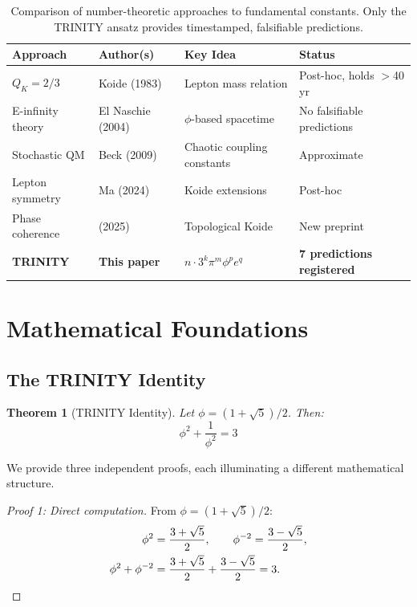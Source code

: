 \documentclass[aps,prd,preprint,superscriptaddress,showpacs,nofootinbib,longbibliography]{revtex4-2}
\newtheorem{theorem}{Theorem}
\begin{document}
\begin{table}[h]
\centering
\small
\begin{tabular}{@{}llll@{}}
\toprule
\textbf{Approach} & \textbf{Author(s)} & \textbf{Key Idea} & \textbf{Status} \\
\midrule
$Q_K = 2/3$ & Koide (1983) & Lepton mass relation & Post-hoc, holds $>$40 yr \\
E-infinity theory & El Naschie (2004) & $\phi$-based spacetime & No falsifiable predictions \\
Stochastic QM & Beck (2009) & Chaotic coupling constants & Approximate \\
Lepton symmetry & Ma (2024) & Koide extensions & Post-hoc \\
Phase coherence & (2025) & Topological Koide & New preprint \\
\textbf{TRINITY} & \textbf{This paper} & \textbf{$n \cdot 3^k\pi^m\phi^pe^q$} & \textbf{7 predictions registered} \\
\bottomrule
\end{tabular}
\caption{Comparison of number-theoretic approaches to fundamental constants. Only the TRINITY ansatz provides timestamped, falsifiable predictions.}
\label{tab:comparison}
\end{table}

\section{Mathematical Foundations}
\label{sec:math}

\subsection{The TRINITY Identity}
\label{sec:identity}

\begin{theorem}[TRINITY Identity]
\label{thm:trinity}
Let $\phi = (1+\sqrt{5})/2$. Then:
\begin{equation}
\label{eq:trinity}
\boxed{\phi^2 + \frac{1}{\phi^2} = 3}
\end{equation}
\end{theorem}

We provide three independent proofs, each illuminating a different mathematical structure.

\begin{proof}[Proof 1: Direct computation]
From $\phi = (1+\sqrt{5})/2$:
\begin{align}
\phi^2 &= \frac{3+\sqrt{5}}{2}, \qquad
\phi^{-2} = \frac{3-\sqrt{5}}{2}, \\
\phi^2 + \phi^{-2} &= \frac{3+\sqrt{5}}{2} + \frac{3-\sqrt{5}}{2} = 3. \qedhere
\end{align}
\end{proof}
\end{document}
